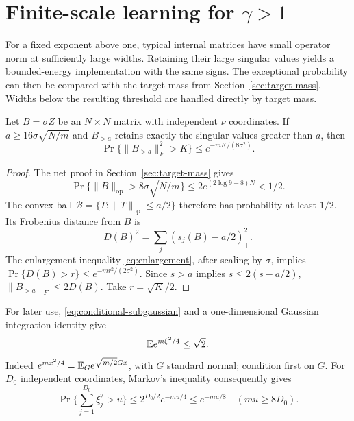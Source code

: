\section{Finite-scale learning for \texorpdfstring{$\gamma>1$}{gamma > 1}}\label{sec:above}
For a fixed exponent above one, typical internal matrices have small
operator norm at sufficiently large widths. Retaining their large
singular values yields a bounded-energy implementation with the same
signs. The exceptional probability can then be compared with the target
mass from Section~\ref{sec:target-mass}. Widths below the resulting
threshold are handled directly by target mass.
\begin{lemma}\label{lem:spectral}
Let $B=\sigma Z$ be an $N\times N$ matrix with independent $\nu$
coordinates. If $a\geq16\sigma\sqrt{N/m}$ and $B_{>a}$ retains
exactly the singular values greater than $a$, then
\[
 \Pr\{\|B_{>a}\|_F^2>K\}\leq e^{-mK/(8\sigma^2)}.
\]
\end{lemma}
\begin{proof}
The net proof in Section~\ref{sec:target-mass} gives
\[
 \Pr\{\|B\|_{\mathrm{op}}>8\sigma\sqrt{N/m}\}
 \leq2e^{(2\log9-8)N}<1/2.
\]
The convex ball $\mathcal B=\{T:\|T\|_{\mathrm{op}}\leq a/2\}$
therefore has probability at least $1/2$. Its Frobenius distance from $B$
is
\[
 D(B)^2=\sum_j(s_j(B)-a/2)_+^2.
\]
The enlargement inequality \eqref{eq:enlargement}, after scaling by
$\sigma$, implies $\Pr\{D(B)>r\}\leq e^{-mr^2/(2\sigma^2)}$.
Since $s>a$ implies $s\leq2(s-a/2)$,
$\|B_{>a}\|_F\leq2D(B)$. Take $r=\sqrt K/2$.
\end{proof}

For later use, \eqref{eq:conditional-subgaussian} and a one-dimensional
Gaussian integration identity give
\begin{equation}\label{eq:square-moment}
 \mathbb E e^{m\xi^2/4}\leq\sqrt2.
\end{equation}
Indeed $e^{m x^2/4}=\mathbb E_G e^{\sqrt{m/2}Gx}$, with $G$ standard normal;
condition first on $G$. For $D_0$ independent coordinates, Markov's
inequality consequently gives
\begin{equation}\label{eq:sum-squares}
 \Pr\{\textstyle\sum_{j=1}^{D_0}\xi_j^2>u\}
 \leq2^{D_0/2}e^{-mu/4}\leq e^{-mu/8}
 \quad(mu\geq8D_0).
\end{equation}

